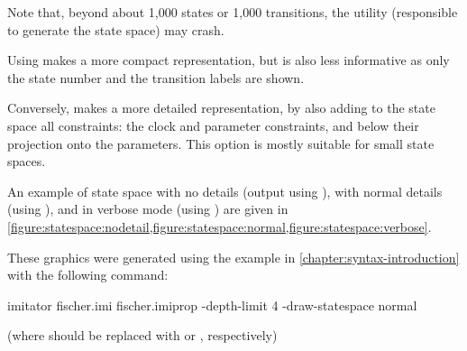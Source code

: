 Note that, beyond about 1,000 states or 1,000 transitions, the \gdot{} utility (responsible to generate the state space) may crash.

Using  makes a more compact representation, but is also less informative as only the state number and the transition labels are shown.

Conversely,  makes a more detailed representation, by also adding to the state space all constraints:
the clock and parameter constraints, and below their projection onto the parameters.
This option is mostly suitable for small state spaces.

\begin{example}
	An example of state space with no details (output using ), with normal details (using ), and in verbose mode (using ) are given in \cref{figure:statespace:nodetail,figure:statespace:normal,figure:statespace:verbose}.

	These graphics were generated using the example in \cref{chapter:syntax-introduction} with the following command:

\begin{terminal}
imitator fischer.imi fischer.imiprop -depth-limit 4 -draw-statespace normal
\end{terminal}

	(where  should be replaced with  or , respectively)
\end{example}

